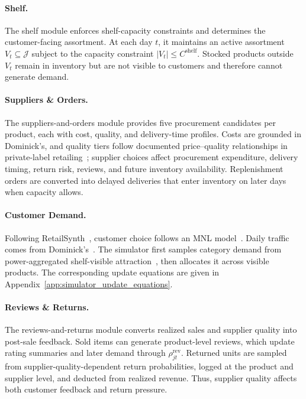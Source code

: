 \paragraph{Shelf.}
The shelf module enforces shelf-capacity constraints and determines the customer-facing assortment. At each day $t$, it maintains an active assortment $V_t \subseteq \mathcal{J}$ subject to the capacity constraint $|V_t| \le C^{\mathrm{shelf}}$. Stocked products outside $V_t$ remain in inventory but are not visible to customers and therefore cannot generate demand.

\paragraph{Suppliers \& Orders.}
The suppliers-and-orders module provides five procurement candidates per product, each with cost, quality, and delivery-time profiles. Costs are grounded in Dominick's, and quality tiers follow documented price--quality relationships in private-label retailing~\citep{supplychain}; supplier choices affect procurement expenditure, delivery timing, return risk, reviews, and future inventory availability. Replenishment orders are converted into delayed deliveries that enter inventory on later days when capacity allows.

\paragraph{Customer Demand.}
Following RetailSynth~\citep{xia2023retailsynth}, customer choice follows an MNL model~\citep{mcfadden_conditional_1974}. Daily traffic comes from Dominick's~\citep{DominicksDataset}. The simulator first samples category demand from power-aggregated shelf-visible attraction~\citep{nakanishi1974mci}, then allocates it across visible products. The corresponding update equations are given in Appendix~\ref{app:simulator_update_equations}.

\paragraph{Reviews \& Returns.}
The reviews-and-returns module converts realized sales and supplier quality into post-sale feedback. Sold items can generate product-level reviews, which update rating summaries and later demand through $\rho^{\mathrm{rev}}_{jt}$. Returned units are sampled from supplier-quality-dependent return probabilities, logged at the product and supplier level, and deducted from realized revenue. Thus, supplier quality affects both customer feedback and return pressure.

